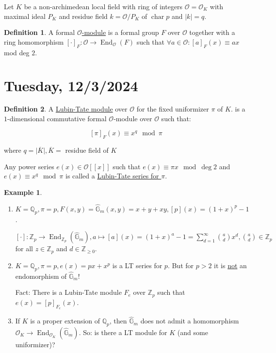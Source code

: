 \documentclass[openany]{amsbook}
\numberwithin{section}{chapter}
\theoremstyle{definition}
\newtheorem*{example}{Example}
\newtheorem*{definition}{Definition}
\begin{document}
Let \(K\) be a non-archimedean local field with ring of integers \(\mathcal{O} = \mathcal{O} _K\) with maximal ideal \(P_K\) and residue field \(k = \mathcal{O} / P_K\) of \(\operatorname{char} p\) and \(\vert k \vert = q\).

\begin{definition}
    A formal \underline{\(\mathcal{O}\)-module} is a formal group \(F\) over \(\mathcal{O}\) together with a ring homomorphism \([\cdot]_F : \mathcal{O} \to \operatorname{End}_{\mathcal{O}}(F)\) such that \(\forall a \in \mathcal{O}: [a]_F (x) \equiv ax\) mod deg \(2\).
\end{definition}

\section*{Tuesday, 12/3/2024}

\begin{definition}
    A \underline{Lubin-Tate module} over \(\mathcal{O}\) for the fixed uniformizer \(\pi\) of \(K\). is a \(1\)-dimensional commutative formal \(\mathcal{O}\)-module over \(\mathcal{O}\) such that:

    \[
        [\pi]_F (x) \equiv x^q \mod \pi
    \]

    where \(q = \vert \overline{K} \vert, \overline{K} =\) residue field of \(K\) 
    
    Any power series \(e(x) \in \mathcal{O} [[x]]\) such that \(e(x) \equiv \pi x \mod \deg 2\) and \(e(x) \equiv x^q \mod \pi\) is called a \underline{Lubin-Tate series for \(\pi \)}.
\end{definition}

\begin{example}

    \begin{enumerate}[label=\arabic*)]
        \item \(K = \mathbb{Q}_p, \pi = p, F(x,y) = \widehat{\mathbb{G}}_m(x,y) = x + y + xy, [p](x) = (1+x)^p - 1\).

        \([\cdot]: \mathbb{Z}_p \to \operatorname{End}_{\mathbb{Z}_p}(\widehat{\mathbb{G}}_m), a \mapsto [a](x) = (1+x)^a - 1 = \sum_{d=1}^{\infty} \binom{a}{d}x^d, \binom{a}{d}\in\mathbb{Z}_p\) for all \(z\in\mathbb{Z}_p\) and \(d \in \mathbb{Z}_{\geq 0}\). 

        \item \(K=\mathbb{Q}_p, \pi =p, e(x)=px+x^p\) is a LT series for \(p\). But for \(p > 2\) it is \underline{not} an endomorphism of \(\widehat{\mathbb{G}}_m\)!

        Fact: There is a Lubin-Tate module \(F_e\) over \(\mathbb{Z}_p\) such that \(e(x) = [p]_{F_e}(x)\).

        \item If \(K\) is a proper extension of \(\mathbb{Q}_p\), then \(\widehat{\mathbb{G}}_m\) does not admit a homomorphism \(\mathcal{O}_K \to \operatorname{End}_{\mathcal{O}_K}(\widehat{\mathbb{G}}_m)\). So: is there a LT module for \(K\) (and some uniformizer)?
        
    \end{enumerate}
    
\end{example}
\end{document}

